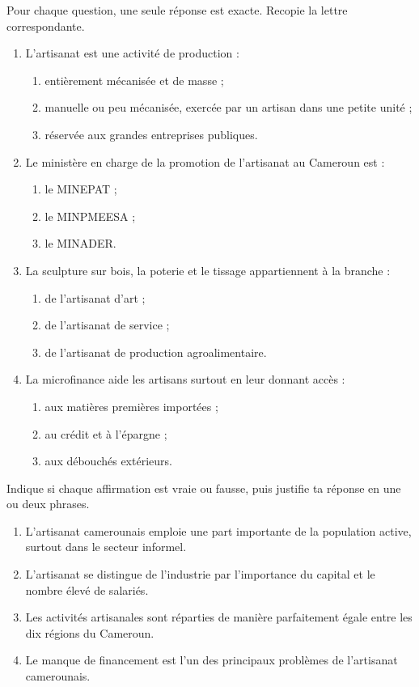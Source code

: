 \documentclass[11pt]{article}
\begin{document}
\begin{exercice}
Pour chaque question, une seule réponse est exacte. Recopie la lettre correspondante.
\begin{enumerate}
\item L'artisanat est une activité de production :
\begin{enumerate}
\item[a)] entièrement mécanisée et de masse ;
\item[b)] manuelle ou peu mécanisée, exercée par un artisan dans une petite unité ;
\item[c)] réservée aux grandes entreprises publiques.
\end{enumerate}
\item Le ministère en charge de la promotion de l'artisanat au Cameroun est :
\begin{enumerate}
\item[a)] le MINEPAT ;
\item[b)] le MINPMEESA ;
\item[c)] le MINADER.
\end{enumerate}
\item La sculpture sur bois, la poterie et le tissage appartiennent à la branche :
\begin{enumerate}
\item[a)] de l'artisanat d'art ;
\item[b)] de l'artisanat de service ;
\item[c)] de l'artisanat de production agroalimentaire.
\end{enumerate}
\item La microfinance aide les artisans surtout en leur donnant accès :
\begin{enumerate}
\item[a)] aux matières premières importées ;
\item[b)] au crédit et à l'épargne ;
\item[c)] aux débouchés extérieurs.
\end{enumerate}
\end{enumerate}
\end{exercice}

\begin{exercice}
Indique si chaque affirmation est vraie ou fausse, puis justifie ta réponse en une ou deux phrases.
\begin{enumerate}
\item L'artisanat camerounais emploie une part importante de la population active, surtout dans le secteur informel.
\item L'artisanat se distingue de l'industrie par l'importance du capital et le nombre élevé de salariés.
\item Les activités artisanales sont réparties de manière parfaitement égale entre les dix régions du Cameroun.
\item Le manque de financement est l'un des principaux problèmes de l'artisanat camerounais.
\end{enumerate}
\end{exercice}
\end{document}
